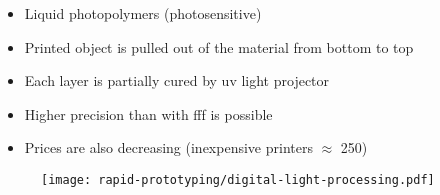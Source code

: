 \begin{frame}
    \begin{itemize}
        \item Liquid photopolymers (photosensitive)
        \item Printed object is pulled out of the material from bottom to top
        \item Each layer is partially cured by \acs{uv} light projector
        \item Higher precision than with \acs{fff} is possible
        \item Prices are also decreasing (inexpensive printers $\approx$ \SI{250}{\sieuro})
    \end{itemize}
\end{frame}

\begin{frame}
    \begin{figure}
        \texttt{[image: rapid-prototyping/digital-light-processing.pdf]}
        \caption{}
    \end{figure}
\end{frame}